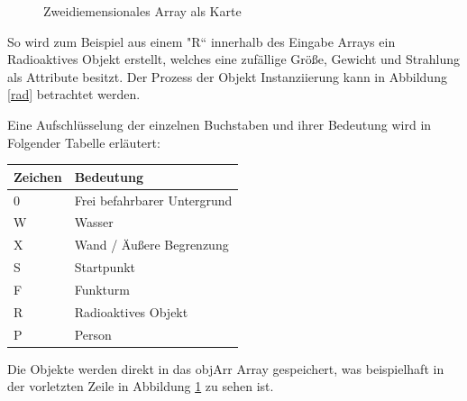 \begin{figure}[H]
  \caption{Zweidiemensionales Array als Karte}
  \label{map}
\end{figure}

So wird zum Beispiel aus einem "R“ innerhalb des Eingabe Arrays ein Radioaktives Objekt erstellt, welches eine zufällige Größe, Gewicht und Strahlung als Attribute besitzt. Der Prozess der Objekt Instanziierung kann in Abbildung \ref{rad} betrachtet werden. 

Eine Aufschlüsselung der einzelnen Buchstaben und ihrer Bedeutung wird in Folgender Tabelle erläutert:
\begin{table}[H]
\centering
\begin{tabular}{l|l}
Zeichen & Bedeutung                 \\ 
\hline
0       & Frei befahrbarer Untergrund             \\
W       & Wasser                    \\
X       & Wand / Äußere Begrenzung  \\
S       & Startpunkt                \\
F       & Funkturm                  \\
R       & Radioaktives Objekt       \\
P       & Person  
\label{buchstaben}
\end{tabular}
\end{table}

Die Objekte werden direkt in das objArr Array gespeichert, was beispielhaft in der vorletzten Zeile in Abbildung \ref{map} zu sehen ist. 


